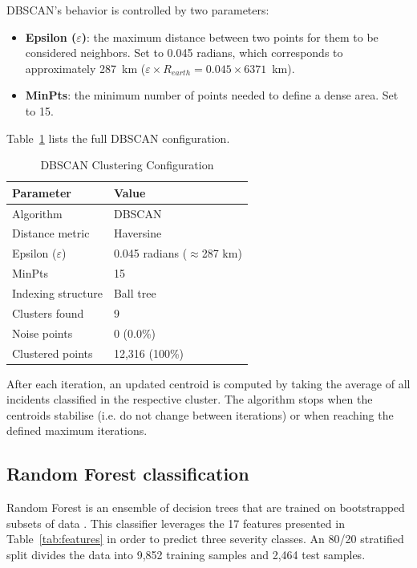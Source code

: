 \documentclass[conference]{IEEEtran}
\begin{document}
DBSCAN's behavior is controlled by two parameters:

\begin{itemize}
\item \textbf{Epsilon ($\varepsilon$)}: the maximum distance between two points for them to be considered neighbors. Set to 0.045 radians, which corresponds to approximately 287~km ($\varepsilon \times R_{earth} = 0.045 \times 6371$~km).
\item \textbf{MinPts}: the minimum number of points needed to define a dense area. Set to 15.
\end{itemize}

Table~\ref{tab:dbscan_params} lists the full DBSCAN configuration.

\begin{table}[htbp]
\caption{DBSCAN Clustering Configuration}
\begin{center}
\begin{tabular}{ll}
\toprule
\textbf{Parameter} & \textbf{Value} \\
\midrule
Algorithm & DBSCAN \\
Distance metric & Haversine \\
Epsilon ($\varepsilon$) & 0.045 radians ($\approx$287 km) \\
MinPts & 15 \\
Indexing structure & Ball tree \\
Clusters found & 9 \\
Noise points & 0 (0.0\%) \\
Clustered points & 12,316 (100\%) \\
\bottomrule
\end{tabular}
\label{tab:dbscan_params}
\end{center}
\end{table}

After each iteration, an updated centroid is computed by taking the average of all incidents classified in the respective cluster. The algorithm stops when the centroids stabilise (i.e. do not change between iterations) or when reaching the defined maximum iterations.

\subsection{Random Forest classification}

Random Forest is an ensemble of decision trees that are trained on bootstrapped subsets of data \cite{b21}. This classifier leverages the 17 features presented in Table~\ref{tab:features} in order to predict three severity classes. An 80/20 stratified split divides the data into 9,852 training samples and 2,464 test samples.
\end{document}
